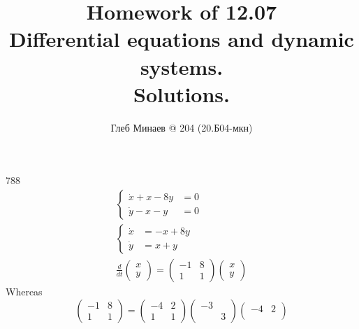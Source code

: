 \documentclass[12pt,a4paper]{article}
\title{Homework of 12.07\\Differential equations and dynamic systems.\\Solutions.}
\author{Глеб Минаев @ 204 (20.Б04-мкн)}
\date{}
\begin{document}
    \maketitle

    \begin{problem}{788}
        \begin{gather*}
            \left\{
                \begin{aligned}
                    \dot{x} + x - 8y &= 0\\
                    \dot{y} - x - y &= 0
                \end{aligned}
            \right.\\
            \left\{
                \begin{aligned}
                    \dot{x} &= -x + 8y\\
                    \dot{y} &= x + y
                \end{aligned}
            \right.\\
            \frac{d}{dt}
            \begin{pmatrix}
                x\\
                y
            \end{pmatrix}
            =
            \begin{pmatrix}
                -1& 8\\
                1& 1
            \end{pmatrix}
            \begin{pmatrix}
                x\\
                y
            \end{pmatrix}
        \end{gather*}
        Whereas
        \[
            \begin{pmatrix}
                -1& 8\\
                1& 1
            \end{pmatrix}
            =
            \begin{pmatrix}
                -4& 2\\
                1& 1
            \end{pmatrix}
            \begin{pmatrix}
                -3&\\
                &3
            \end{pmatrix}
            \begin{pmatrix}
                -4& 2\\

\end{pmatrix}\]
\end{problem}
\end{document}
